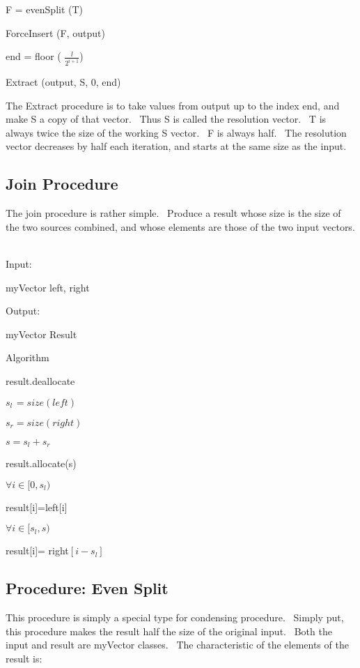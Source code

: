 \qquad F = evenSplit (T)

\qquad ForceInsert (F, output)

\qquad end = floor ( $\frac{l}{2^{i+1}}$)

\qquad Extract (output, S, 0, end)

\bigskip

The Extract procedure is to take values from output up to the index end, and
make S a copy of that vector. \ Thus S is called the resolution vector. \ T
is always twice the size of the working S vector. \ F is always half. \ The
resolution vector decreases by half each iteration, and starts at the same
size as the input.

\bigskip

\subsection{Join Procedure}

The join procedure is rather simple. \ Produce a result whose size is the
size of the two sources combined, and whose elements are those of the two
input vectors. \ 

Input:

\qquad myVector left, right

Output:

\qquad myVector Result

Algorithm

\qquad result.deallocate

\qquad $s_{l\,}=size(left)$

\qquad $s_{r}=size(right)$

\qquad $s=s_{l}+s_{r}$

\qquad result.allocate(s)

\qquad $\forall i\in \lbrack 0,s_{l})$

\qquad \qquad result[i]=left[i]

\qquad $\forall i\in \lbrack s_{l},s)$

\qquad \qquad result[i]= right$[i-s_{l}]$

\subsection{Procedure: Even Split}

This procedure is simply a special type for condensing procedure. \ Simply
put, this procedure makes the result half the size of the original input. \
Both the input and result are myVector classes. \ The characteristic of the
elements of the result is:

